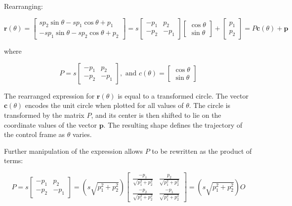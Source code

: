 \documentclass[11pt]{article}
\newcommand{\bs}[1]{\boldsymbol{#1}} %
\begin{document}
        Rearranging:
        
        \begin{equation}
            \bs{r}(\theta) = 
            \begin{bmatrix} sp_2\sin\theta - sp_1\cos\theta + p_1 \\ 
                            -sp_1\sin\theta - sp_2\cos\theta + p_2 \end{bmatrix} 
            = s\begin{bmatrix}    -p_1 & p_2 \\ 
                                -p_2 & -p_1\end{bmatrix}
            \begin{bmatrix} \cos\theta \\ \sin\theta \end{bmatrix} + \begin{bmatrix} p_1 \\ p_2 \end{bmatrix}      
            = P\bs{c}(\theta) + \bs{p}
            \label{eq:Eq61}
        \end{equation}
        
        where
    
        \begin{equation}
            P = s\begin{bmatrix}-p_1 & p_2 \\ -p_2 & -p_1\end{bmatrix}, 
            \text{ and } c(\theta) = \begin{bmatrix}\cos\theta\\\sin\theta\end{bmatrix}
            \label{eq:Eq63}
        \end{equation}
    
        The rearranged expression for $\bs{r}(\theta)$ is equal to a transformed circle. The vector $\bs{c}(\theta)$ encodes the unit circle when plotted for all values of $\theta$. The circle is transformed by the matrix $P$, and its center is then shifted to lie on the coordinate values of the vector $\bs{p}$. The resulting shape defines the trajectory of the control frame as $\theta$ varies.
    
        Further manipulation of the expression allows $P$ to be rewritten as the product of terms:
    
        \begin{equation}
            P = s\begin{bmatrix}-p_1 & p_2 \\ -p_2 & -p_1\end{bmatrix} 
            = \left(s\sqrt{p_1^2 + p_2^2}\right)\begin{bmatrix}\frac{-p_1}{\sqrt{p_1^2 + p_2^2}} & \frac{p_2}{\sqrt{p_1^2 + p_2^2}} 
                                                            \\ \frac{-p_2}{\sqrt{p_1^2 + p_2^2}} & \frac{-p_1}{\sqrt{p_1^2 + p_2^2}}\end{bmatrix}
            =\left(s\sqrt{p_1^2 + p_2^2}\right)O
            \label{eq:Eq63}
        \end{equation}
                
\end{document}
